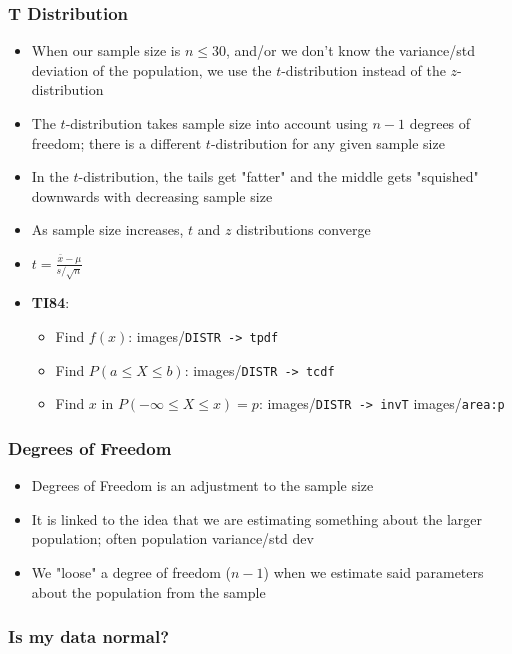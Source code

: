 \documentclass{article}
\newcommand{\code}[1]{images/\colorbox{light-gray}{\texttt{#1}}}
\begin{document}
\subsubsection{T Distribution}

\begin{itemize}
    \item When our sample size is $n \leq 30$, and/or we don't know the variance/std deviation of the population, we use the $t$-distribution instead of the $z$-distribution
    \item The $t$-distribution takes sample size into account using $n-1$ degrees of freedom; there is a different $t$-distribution for any given sample size
    \item In the $t$-distribution, the tails get "fatter" and the middle gets "squished" downwards with decreasing sample size
    \item As sample size increases, $t$ and $z$ distributions converge
    \item $t=\frac{\bar{x}-\mu}{s/\sqrt{n}}$
    \item \textbf{TI84}:
    \begin{itemize}
        \item Find $f(x)$: \code{DISTR -> tpdf}
        \item Find $P(a\leq X\leq b)$: \code{DISTR -> tcdf} 
        \item Find $x$ in $P(-\infty \leq X\leq x)=p$: \code{DISTR -> invT} \code{area:p}
    \end{itemize}
\end{itemize}

\subsubsection{Degrees of Freedom}

\begin{itemize}
    \item Degrees of Freedom is an adjustment to the sample size
    \item It is linked to the idea that we are estimating something about the larger population; often population variance/std dev
    \item We "loose" a degree of freedom ($n-1$) when we estimate said parameters about the population from the sample
\end{itemize}

\subsubsection{Is my data normal?}
\end{document}
